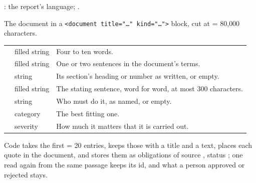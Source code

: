  : the report's language; .

 The document in a \texttt{<document title="…" kind="…">}
block, cut at  = 80{,}000 characters.

\par\nopagebreak
\begin{xltabular}{\textwidth}{@{}L{44mm}L{22mm}Y@{}}
\toprule
{} &  &  \\
\midrule
\endhead
\bottomrule
\endlastfoot
{} & filled string & Four to ten words. \\
 & filled string & One or two sentences in the document's terms. \\
 & string & Its section's heading or number as written, or empty. \\
 & filled string & The stating sentence, word for word, at most 300 characters. \\
 & string & Who must do it, as named, or empty. \\
 & category & The best fitting one. \\
 & severity & How much it matters that it is carried out. \\
\end{xltabular}

Code takes the first  = 20 entries, keeps those with a title
and a text, places each quote in the document, and stores them as obligations of source ,
status ; one read again from the same passage keeps its id, and what a person
approved or rejected stays.

